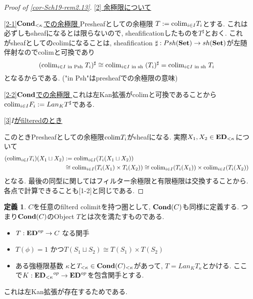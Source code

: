 \documentclass[dvipdfmx,a4paper,11pt]{article}
\newcommand{\colim}{{\rm colim}}
\theoremstyle{definition}
\newtheorem{dfn}[thm]{定義}
\begin{document}
\begin{proof}[Proof of \ref{cor-Sch19-rem2.13}]
\underline{ [2] 余極限について }

\underline{[2-1]${\bf Cond}_{< \kappa}$での余極限 }
Presheafとしての余極限
$T:=\colim_{i \in I}T_i$とする.
 これは必ずしもsheafになるとは限らないので, sheafificationしたものを$T^{\sharp}$とおく.
 これがsheafとしてのcolimになることは, sheafification
 $\sharp : Psh({\bf Set}) \to sh({\bf Set}) $が左随伴射なのでcolimと可換であり
 $$
 (\colim_{i \in I \text{ in Psh }}T_i)^{\sharp} \cong \colim_{i \in I \text{ in sh }}(T_i)^{\sharp}=\colim_{i \in I \text{ in sh }}T_i
 $$
 となるからである. ("in Psh"はpresheafでの余極限の意味)
 
 \underline{[2-2]${\bf Cond}$での余極限 }
 これは左Kan拡張がcolimと可換であることから$\colim_{i \in I}F_i := Lan_{K}T^{\sharp}$である. 

\underline{ [3]$I$がfilteredのとき }
 
このときPresheafとしての余極限$\colim T_i$がsheafになる. 
 実際$X_1, X_2 \in {\bf ED}_{< \kappa}$について
\begin{align*}
\begin{split}
(\colim_{i \in I}T_i)(X_1 \sqcup  X_2 ) 
&:= \colim_{i \in I}(T_i(X_1\sqcup X_2)) \\
&\cong 
\colim_{i \in I}(T_i(X_1)\times T_i( X_2))
\cong
\colim_{i \in I}(T_i(X_1))\times \colim_{i \in I}(T_i( X_2))
\end{split}
\end{align*}
となる. 最後の同型に関してはフィルター余極限と有限極限は交換することから.
 各点で計算できることも[1-2]と同じである. 
\end{proof}

 \begin{tcolorbox}
 [colback = white, colframe = green!35!black, fonttitle = \bfseries,breakable = true]
 \begin{dfn}
$C$を任意のfilterd colimitを持つ圏として, ${\bf Cond}(C)$も同様に定義する.
つまり${\bf Cond}(C)$のObject $T$とは次を満たすものである.
\begin{itemize}
\item $T : {\bf ED}^{op} \to C$ なる関手
\item $T(\phi)=1$ かつ$T(S_1\sqcup S_2) \cong T(S_1) \times T(S_2)$
\item ある強極限基数 $\kappa$と$T_{<\kappa} \in {\bf Cond}(C)_{< \kappa}$があって, $T = Lan_{K}T_{\kappa}$とかける. ここで$K : {{\bf ED}_{<\kappa}}^{op} \to {\bf ED}^{op}$を包含関手とする.
\end{itemize}

 \end{dfn}
 \end{tcolorbox}
これは左Kan拡張が存在するためである. 
\end{document}
